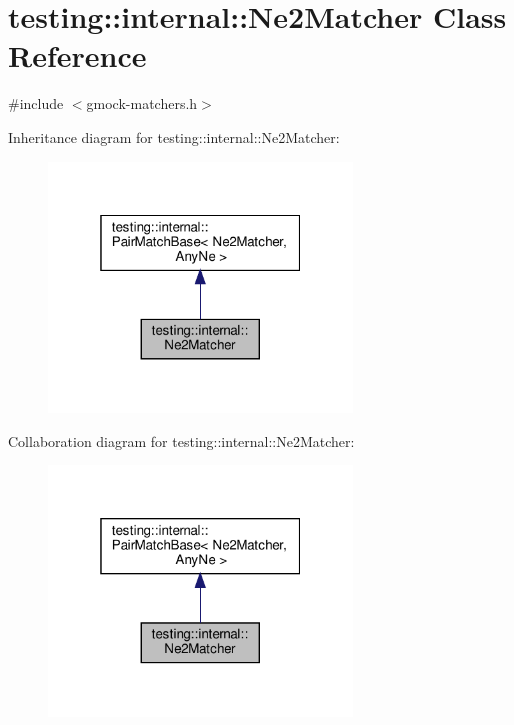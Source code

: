\hypertarget{classtesting_1_1internal_1_1_ne2_matcher}{}\section{testing\+:\+:internal\+:\+:Ne2\+Matcher Class Reference}
\label{classtesting_1_1internal_1_1_ne2_matcher}


{\ttfamily \#include $<$gmock-\/matchers.\+h$>$}



Inheritance diagram for testing\+:\+:internal\+:\+:Ne2\+Matcher\+:
\nopagebreak
\begin{figure}[H]
\begin{center}
\leavevmode
\includegraphics[width=229pt]{classtesting_1_1internal_1_1_ne2_matcher__inherit__graph}
\end{center}
\end{figure}


Collaboration diagram for testing\+:\+:internal\+:\+:Ne2\+Matcher\+:
\nopagebreak
\begin{figure}[H]
\begin{center}
\leavevmode
\includegraphics[width=229pt]{classtesting_1_1internal_1_1_ne2_matcher__coll__graph}
\end{center}
\end{figure}
